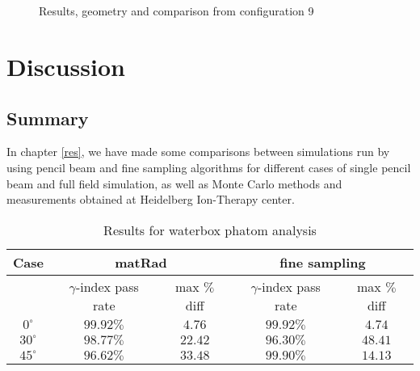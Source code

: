 \documentclass[12pt, a4paper, twoside]{book}
\begin{document}
\begin{figure}[h!]
\centering
{} \\
 \\
 \quad
\caption{Results, geometry and comparison from configuration 9}
\label{fig:pos9}
\end{figure}



\chapter{Discussion} %

\section{Summary}
In chapter \ref{res}, we have made some comparisons between simulations run by using pencil beam and fine sampling algorithms for different cases of single pencil beam and full field simulation, as well as Monte Carlo methods and measurements obtained at Heidelberg Ion-Therapy center.
\begin{table}[b]
\centering
\begin{tabular}{ccccc}
\toprule
Case & \multicolumn{2}{c}{matRad} & \multicolumn{2}{c}{fine sampling}\\
\midrule
 & $\gamma$-index pass rate & max $\%$ diff & $\gamma$-index pass rate & max $\%$ diff\\
\midrule
$0^\circ$ & $99.92\%$ & $4.76$ & $99.92\%$ & $4.74$\\
$30^\circ$ & $98.77\%$ & $22.42$ & $96.30\%$ & $48.41$\\
$45^\circ$ & $96.62\%$ & $33.48$ & $99.90\%$ & $14.13$\\
\bottomrule
\end{tabular}
\caption{Results for waterbox phatom analysis}
\label{tab:hom}
\end{table}
\end{document}
